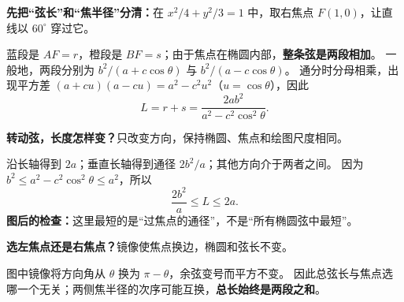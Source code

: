 \clearpage
\begin{explanationbox}
\textbf{先把“弦长”和“焦半径”分清：}在 $x^2/4+y^2/3=1$ 中，取右焦点 $F(1,0)$，让直线以 $60^\circ$ 穿过它。
\begin{center}\end{center}
蓝段是 $AF=r$，橙段是 $BF=s$；由于焦点在椭圆内部，\textbf{整条弦是两段相加}。
一般地，两段分别为 $b^2/(a+c\cos\theta)$ 与 $b^2/(a-c\cos\theta)$。
通分时分母相乘，出现平方差 $(a+cu)(a-cu)=a^2-c^2u^2$（$u=\cos\theta$），因此
\[
 \boxed{L=r+s=\frac{2ab^2}{a^2-c^2\cos^2\theta}}.
\]
\end{explanationbox}
\clearpage
\begin{explanationbox}
\textbf{转动弦，长度怎样变？}只改变方向，保持椭圆、焦点和绘图尺度相同。
\begin{center}\end{center}
沿长轴得到 $2a$；垂直长轴得到通径 $2b^2/a$；其他方向介于两者之间。
因为 $b^2\le a^2-c^2\cos^2\theta\le a^2$，所以
\[
 \boxed{\frac{2b^2}{a}\le L\le2a}.
\]
\textbf{图后的检查：}这里最短的是“过焦点的通径”，不是“所有椭圆弦中最短”。
\end{explanationbox}
\clearpage
\begin{explanationbox}
\textbf{选左焦点还是右焦点？}镜像使焦点换边，椭圆和弦长不变。
\begin{center}\end{center}
图中镜像将方向角从 $\theta$ 换为 $\pi-\theta$，余弦变号而平方不变。
因此总弦长与焦点选哪一个无关；两侧焦半径的次序可能互换，\textbf{总长始终是两段之和}。
\end{explanationbox}

